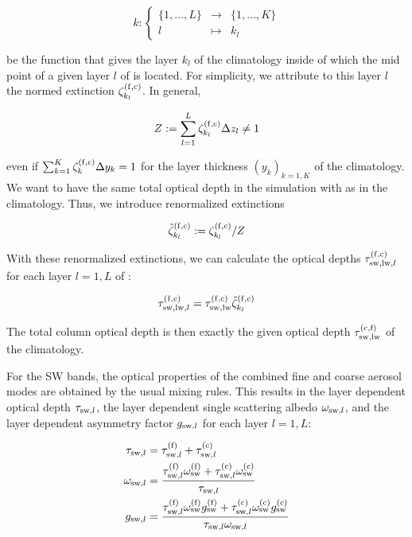 \begin{appendix}
\begin{displaymath}
k:\left\{\begin{array}{ccc}
\{1,\dots,L\} & \rightarrow & \{1,\dots,K\}\\
l & \mapsto & k_l
\end{array}\right.
\end{displaymath}

be the function that gives the layer $k_l$ of the climatology inside
of which the 
mid point of a given layer $l$ of \echam{} is located. For simplicity, we
attribute to this \echam{} layer $l$ the normed extinction $\zeta^{\rm
  (f,c)}_{k_l}$. In general, 

\begin{displaymath}
Z:=\sum\limits_{l=1}^{L}\zeta^{\rm (f,c)}_{k_l}\Delta z_l\neq 1
\end{displaymath}

even if $\sum_{k=1}^K \zeta^{\rm (f,c)}_{k}\Delta y_k=1$ for the layer
thickness $(y_k)_{k=1,K}$ of the climatology. We want to have the same total
optical depth in the simulation with \echam{} as in the climatology. Thus,
we introduce renormalized extinctions

\begin{displaymath}
\tilde{\zeta}_{k_l}^{\rm (f,c)}:=\zeta_{k_l}^{\rm (f,c)}/Z
\end{displaymath}

With these renormalized extinctions, we can calculate the optical
depths $\tau_{{\rm sw,lw},l}^{{\rm (f,c)}}$ for each layer $l=1,L$ of
\echam:

\begin{equation}
\tau_{{\rm sw,lw},l}^{{\rm (f,c)}}=\tau_{\rm sw,lw}^{\rm
  (f,c)}\tilde{\zeta}^{\rm (f,c)}_{k_l} 
\end{equation}

The total column optical depth is then exactly the given optical depth
$\tau_{\rm sw,lw}^{\rm (c,f)}$ of the climatology.

For the SW bands, the optical properties of the combined fine and
coarse aerosol modes are obtained by the usual mixing rules.
This results in the layer dependent optical depth
$\tau_{{\rm sw},l}$, the layer dependent single scattering albedo
$\omega_{{\rm sw},l}$, and the layer dependent asymmetry factor
$g_{{\rm sw},l}$ for each \echam{} layer $l=1,L$:

\begin{align}
\label{eqswtau}
\tau_{{\rm sw},l} & = \tau_{{\rm sw},l}^{\rm (f)}+ \tau_{{\rm
  sw},l}^{\rm (c)}\\
\label{eqswomega}
\omega_{{\rm sw},l} & = \frac{\tau_{{\rm sw},l}^{\rm (f)}\omega_{\rm
    sw}^{\rm (f)}+\tau_{{\rm sw},l}^{\rm (c)}\omega_{\rm
    sw}^{\rm (c)}}{\tau_{{\rm sw},l}}\\
\label{eqswg} 
g_{{\rm sw},l} & = \frac{\tau_{{\rm sw},l}^{\rm (f)}\omega_{\rm
    sw}^{\rm (f)}g_{\rm
    sw}^{\rm (f)}+\tau_{{\rm sw},l}^{\rm (c)}\omega_{\rm
    sw}^{\rm (c)}g_{\rm
    sw}^{\rm (c)}}{\tau_{{\rm sw},l}\omega_{{\rm sw},l}}
\end{align}


\end{appendix}
